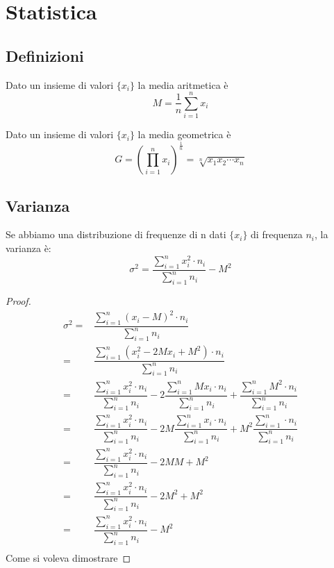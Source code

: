 \chapter{Statistica}
\section{Definizioni}
\begin{defn}\label{defn:mediaritmetica}
	Dato un insieme di valori $\lbrace x_i \rbrace$ la media aritmetica è\[M=\dfrac{1}{n}\sum_{i=1}^{n}x_{i}\]
\end{defn}
\begin{defn}\label{defn:mediageometrica}
	Dato un insieme di valori $\lbrace x_i \rbrace$ la media geometrica è\[G=\left(\prod _{i=1}^{n}x_{i}\right)^{\frac {1}{n}}={\sqrt[{n}]{x_{1}x_{2}\cdots x_{n}}}\]
\end{defn}
\section{Varianza}
\begin{thm}[Varianza]
	Se abbiamo una distribuzione di frequenze di n dati  $\lbrace x_i \rbrace$ di frequenza $n_{i}$, la varianza è: \[\sigma^{2}=\dfrac{\sum_{i=1}^{n}x_{i}^{2}\cdot n_{i}}{\sum_{i=1}^{n} n_{i}}-M^2\] 
\end{thm}
\begin{proof}
	\begin{align*}
	\sigma^{2}=&\dfrac{\sum_{i=1}^{n}(x_{i}-M)^{2}\cdot n_{i}}{\sum_{i=1}^{n} n_{i}}\\
	=&\dfrac{\sum_{i=1}^{n}(x_{i}^{2} -2Mx_{i}+M^{2})\cdot n_{i}}{\sum_{i=1}^{n} n_{i}}\\
	=&\dfrac{\sum_{i=1}^{n}x_{i}^{2}\cdot n_{i}}{\sum_{i=1}^{n} n_{i}}-2 \dfrac{\sum_{i=1}^{n}Mx_{i}\cdot n_{i}}{\sum_{i=1}^{n} n_{i}} +\dfrac{\sum_{i=1}^{n}M^{2}\cdot n_{i}}{\sum_{i=1}^{n} n_{i}}\\
	=&\dfrac{\sum_{i=1}^{n}x_{i}^{2}\cdot n_{i}}{\sum_{i=1}^{n} n_{i}}-2M \dfrac{\sum_{i=1}^{n}x_{i}\cdot n_{i}}{\sum_{i=1}^{n} n_{i}} +M^{2}\dfrac{\sum_{i=1}^{n}\cdot n_{i}}{\sum_{i=1}^{n} n_{i}}\\
	=&\dfrac{\sum_{i=1}^{n}x_{i}^{2}\cdot n_{i}}{\sum_{i=1}^{n} n_{i}}-2MM +M^{2}\\
	=&\dfrac{\sum_{i=1}^{n}x_{i}^{2}\cdot n_{i}}{\sum_{i=1}^{n} n_{i}}-2M^{2} +M^{2}\\
	=&\dfrac{\sum_{i=1}^{n}x_{i}^{2}\cdot n_{i}}{\sum_{i=1}^{n} n_{i}}-M^{2}\\
	\end{align*}
	Come si voleva dimostrare
\end{proof}
